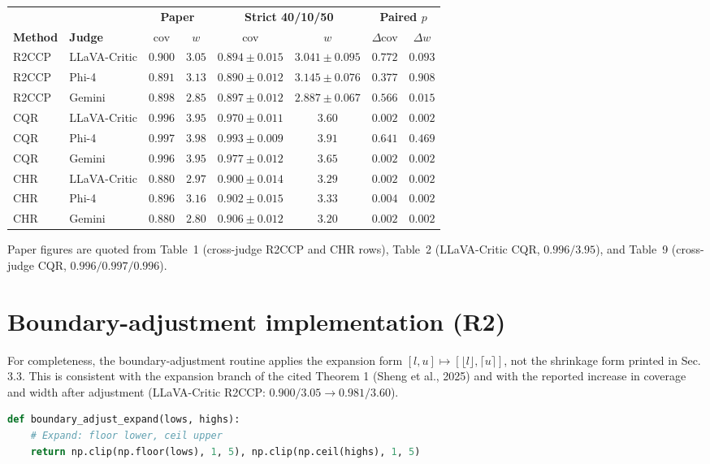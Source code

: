 \documentclass[11pt]{article}
\begin{document}
\begin{center}
\footnotesize
\setlength{\tabcolsep}{5pt}
\begin{tabular}{ll cc cc cc}
\toprule
 & & \multicolumn{2}{c}{\textbf{Paper}} & \multicolumn{2}{c}{\textbf{Strict 40/10/50}} & \multicolumn{2}{c}{\textbf{Paired $p$}} \\
\cmidrule(lr){3-4}\cmidrule(lr){5-6}\cmidrule(lr){7-8}
\textbf{Method} & \textbf{Judge} & cov & $w$ & cov & $w$ & $\Delta$cov & $\Delta w$ \\
\midrule
R2CCP & LLaVA-Critic & $0.900$ & $3.05$ & $0.894 \pm 0.015$ & $3.041 \pm 0.095$ & $0.772$ & $0.093$ \\
R2CCP & Phi-4        & $0.891$ & $3.13$ & $0.890 \pm 0.012$ & $3.145 \pm 0.076$ & $0.377$ & $0.908$ \\
R2CCP & Gemini       & $0.898$ & $2.85$ & $0.897 \pm 0.012$ & $2.887 \pm 0.067$ & $0.566$ & $0.015$ \\
\midrule
CQR   & LLaVA-Critic & $0.996$ & $3.95$ & $0.970 \pm 0.011$ & $3.60$ & $0.002$ & $0.002$ \\
CQR   & Phi-4        & $0.997$ & $3.98$ & $0.993 \pm 0.009$ & $3.91$ & $0.641$ & $0.469$ \\
CQR   & Gemini       & $0.996$ & $3.95$ & $0.977 \pm 0.012$ & $3.65$ & $0.002$ & $0.002$ \\
\midrule
CHR   & LLaVA-Critic & $0.880$ & $2.97$ & $\mathbf{0.900 \pm 0.014}$ & $3.29$ & $0.002$ & $0.002$ \\
CHR   & Phi-4        & $0.896$ & $3.16$ & $\mathbf{0.902 \pm 0.015}$ & $3.33$ & $0.004$ & $0.002$ \\
CHR   & Gemini       & $0.880$ & $2.80$ & $\mathbf{0.906 \pm 0.012}$ & $3.20$ & $0.002$ & $0.002$ \\
\bottomrule
\end{tabular}
\end{center}

Paper figures are quoted from Table~1 (cross-judge R2CCP and CHR rows), Table~2
(LLaVA-Critic CQR, $0.996/3.95$), and Table~9 (cross-judge CQR, $0.996/0.997/0.996$).

\bigskip

\section*{Boundary-adjustment implementation (R2)}

For completeness, the boundary-adjustment routine applies the expansion form
$[l,u]\mapsto[\lfloor l\rfloor,\lceil u\rceil]$, not the shrinkage form printed in
Sec. 3.3. This is consistent with the expansion branch of the cited Theorem 1
(Sheng et al., 2025) and with the reported increase in coverage and width after
adjustment (LLaVA-Critic R2CCP: $0.900/3.05 \to 0.981/3.60$).

\begin{lstlisting}[language=Python]
def boundary_adjust_expand(lows, highs):
    # Expand: floor lower, ceil upper
    return np.clip(np.floor(lows), 1, 5), np.clip(np.ceil(highs), 1, 5)
\end{lstlisting}
\end{document}
